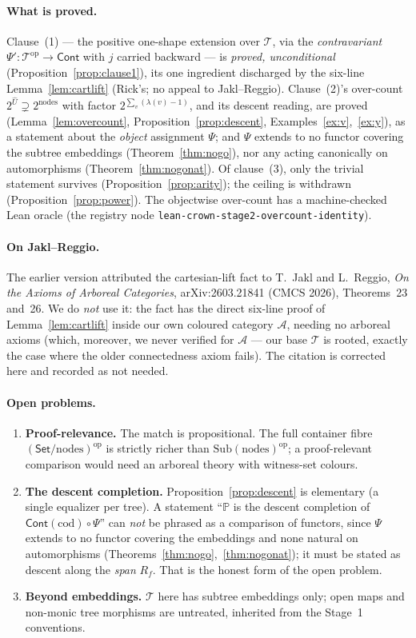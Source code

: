 \documentclass[11pt]{article}
\theoremstyle{definition}
\newcommand{\Set}{\mathsf{Set}}
\newcommand{\Cont}{\mathsf{Cont}}
\newcommand{\Sub}{\mathrm{Sub}}
\newcommand{\cod}{\mathrm{cod}}
\newcommand{\nodes}{\mathrm{nodes}}
\newcommand{\op}{\mathrm{op}}
\newcommand{\Tree}{\mathcal{T}}
\newcommand{\Arb}{\mathcal{A}}
\newcommand{\Pfib}{\mathbb{P}}
\newcommand{\Uf}{\widehat{U}}
\newcommand{\Psip}{\Psi'}
\begin{document}
\paragraph{What is proved.}
Clause~(1) --- the positive one-shape extension over $\Tree$, via the \emph{contravariant}
$\Psip\colon\Tree^\op\to\Cont$ with $j$ carried backward --- is \emph{proved, unconditional}
(Proposition~\ref{prop:clause1}), its one ingredient discharged by the six-line
Lemma~\ref{lem:cartlift} (Rick's; no appeal to Jakl--Reggio). Clause~(2)'s over-count $2^{\Uf}\supsetneq
2^{\nodes}$ with factor $2^{\sum_v(\lambda(v)-1)}$, and its descent reading, are proved
(Lemma~\ref{lem:overcount}, Proposition~\ref{prop:descent}, Examples~\ref{ex:v},~\ref{ex:y}), as a
statement about the \emph{object} assignment $\Psi$; and $\Psi$ extends to no functor covering the
subtree embeddings (Theorem~\ref{thm:nogo}), nor any acting canonically on automorphisms
(Theorem~\ref{thm:nogonat}). Of clause~(3), only the trivial statement survives
(Proposition~\ref{prop:arity}); the ceiling is withdrawn (Proposition~\ref{prop:power}). The
objectwise over-count has a machine-checked Lean oracle (the registry node
\texttt{lean-crown-stage2-overcount-identity}).

\paragraph{On Jakl--Reggio.}
The earlier version attributed the cartesian-lift fact to T.~Jakl and L.~Reggio, \emph{On the Axioms
of Arboreal Categories}, arXiv:2603.21841 (CMCS 2026), Theorems~23 and~26. We do \emph{not} use it:
the fact has the direct six-line proof of Lemma~\ref{lem:cartlift} inside our own coloured category
$\Arb$, needing no arboreal axioms (which, moreover, we never verified for $\Arb$ --- our base
$\Tree$ is rooted, exactly the case where the older connectedness axiom fails). The citation is
corrected here and recorded as not needed.

\paragraph{Open problems.}
\begin{enumerate}
\item \textbf{Proof-relevance.} The match is propositional. The full container fibre
$(\Set/\nodes)^\op$ is strictly richer than $\Sub(\nodes)^\op$; a proof-relevant comparison would
need an arboreal theory with witness-set colours.
\item \textbf{The descent completion.} Proposition~\ref{prop:descent} is elementary (a single
equalizer per tree). A statement ``$\Pfib$ is the descent completion of $\Cont(\cod)\circ\Psi$'' can
\emph{not} be phrased as a comparison of functors, since $\Psi$ extends to no functor covering the
embeddings and none natural on automorphisms (Theorems~\ref{thm:nogo},~\ref{thm:nogonat}); it must
be stated as descent along the \emph{span} $R_f$. That is the
honest form of the open problem.
\item \textbf{Beyond embeddings.} $\Tree$ here has subtree embeddings only; open maps and non-monic
tree morphisms are untreated, inherited from the Stage~1 conventions.
\end{enumerate}
\end{document}
